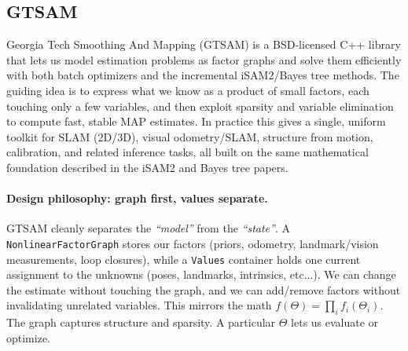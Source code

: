 \subsection{GTSAM}
Georgia Tech Smoothing And Mapping (GTSAM) is a BSD-licensed C++ library that lets us model estimation problems as factor graphs and solve them efficiently with both batch optimizers and the incremental iSAM2/Bayes tree methods. The guiding idea is to express what we know as a product of small factors, each touching only a few variables, and then exploit sparsity and variable elimination to compute fast, stable MAP estimates. In practice this gives a single, uniform toolkit for SLAM (2D/3D), visual odometry/SLAM, structure from motion, calibration, and related inference tasks, all built on the same mathematical foundation described in the iSAM2 and Bayes tree papers\cite{GTSAM_handbook,iSAM2_paper,Bayes_tree_for_SLAM_paper}.

\paragraph{Design philosophy: graph first, values separate.}
GTSAM cleanly separates the \textit{``model''} from the \textit{``state''}. A \texttt{NonlinearFactorGraph} stores our factors (priors, odometry, landmark/vision measurements, loop closures), while a \texttt{Values} container holds one current assignment to the unknowns (poses, landmarks, intrinsics, etc...). We can change the estimate without touching the graph, and we can add/remove factors without invalidating unrelated variables. This mirrors the math $f(\Theta)=\prod_i f_i(\Theta_i)$. The graph captures structure and sparsity. A particular $\Theta$ lets us evaluate or optimize. \cite{GTSAM_handbook}

